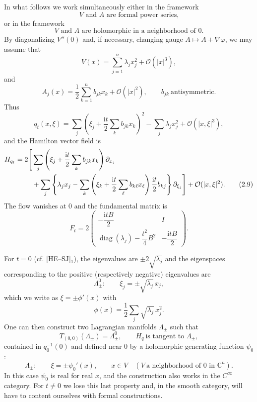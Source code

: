 \documentclass[11pt]{article}
\newcommand{\C}{\mathbb{C}}
\newcommand{\diag}{\operatorname{diag}}
\newcommand{\OO}{\mathcal O}
\newcommand{\ii}{\mathrm{i}}
\begin{document}
In what follows we work simultaneously either in the framework
\begin{equation}
\text{$V$ and $A$ are formal power series,}
\tag{2.5$_1$}
\end{equation}
or in the framework
\begin{equation}
\text{$V$ and $A$ are holomorphic in a neighborhood of $0$.}
\tag{2.5$_2$}
\end{equation}
By diagonalizing $V''(0)$ and, if necessary, changing gauge $A\mapsto A+\nabla\varphi$, we may assume that
\begin{equation}
V(x)=\sum_{j=1}^n\lambda_jx_j^2+\OO(|x|^3),
\tag{2.6}
\end{equation}
and
\begin{equation}
A_j(x)=\frac12\sum_{k=1}^n b_{jk}x_k+\OO(|x|^2),
\qquad b_{jk}\ \text{antisymmetric}.
\tag{2.7}
\end{equation}
Thus
\begin{equation}
q_t(x,\xi)=
\sum_j\left(\xi_j+\frac{\ii t}{2}\sum_kb_{jk}x_k\right)^2
-\sum_j\lambda_jx_j^2+\OO(|x,\xi|^3),
\tag{2.8}
\end{equation}
and the Hamilton vector field is
\begin{align}
H_{q_t}=2\Bigg[&\sum_j\left(\xi_j+\frac{\ii t}{2}\sum_kb_{jk}x_k\right)\partial_{x_j}
\notag\\
&+\sum_j\left\{\lambda_jx_j-
\sum_k\left(\xi_k+\frac{\ii t}{2}\sum_\ell b_{k\ell}x_\ell\right)
\frac{\ii t}{2}b_{kj}\right\}\partial_{\xi_j}\Bigg]
+\OO(|x,\xi|^2).
\tag{2.9}
\end{align}
The flow vanishes at $0$ and the fundamental matrix is
\begin{equation}
F_t=2
\begin{pmatrix}
-\dfrac{\ii tB}{2} & I\\[1ex]
\diag(\lambda_j)-\dfrac{t^2}{4}B^2 & -\dfrac{\ii tB}{2}
\end{pmatrix}.
\tag{2.10}
\end{equation}

For $t=0$ (cf. [HE--SJ]$_1$), the eigenvalues are $\pm2\sqrt{\lambda_j}$ and the eigenspaces corresponding to the positive (respectively negative) eigenvalues are
\begin{equation}
\Lambda_\pm^0:\qquad \xi_j=\pm\sqrt{\lambda_j}\,x_j,
\tag{2.11}
\end{equation}
which we write as $\xi=\pm\phi'(x)$ with
\[
\phi(x)=\frac12\sum_j\sqrt{\lambda_j}\,x_j^2.
\]
One can then construct two Lagrangian manifolds $\Lambda_\pm$ such that
\begin{equation}
T_{(0,0)}(\Lambda_\pm)=\Lambda_\pm^0,
\qquad H_q\ \text{is tangent to }\Lambda_\pm,
\tag{2.12}
\end{equation}
contained in $q_0^{-1}(0)$ and defined near $0$ by a holomorphic generating function $\psi_0$:
\begin{equation}
\Lambda_\pm:\qquad \xi=\pm\psi_0'(x),
\qquad x\in V\quad(V\ \text{a neighborhood of }0\text{ in }\C^n).
\tag{2.13}
\end{equation}
In this case $\psi_0$ is real for real $x$, and the construction also works in the $C^\infty$ category. For $t\ne0$ we lose this last property and, in the smooth category, will have to content ourselves with formal constructions.
\end{document}
